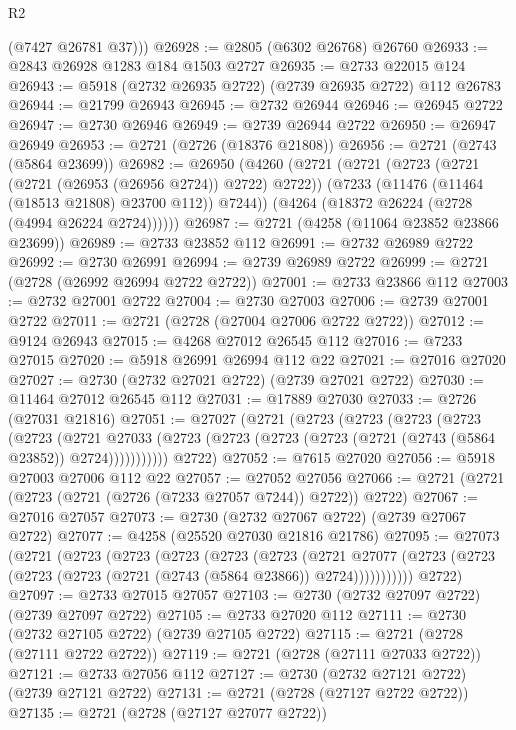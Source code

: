 \begin{lexlean}{R2}
\begin{coremodule}
        (@7427 @26781 @37)))
@26928 := @2805 (@6302 @26768) @26760
@26933 := @2843 @26928 @1283 @184 @1503 @2727
@26935 := @2733 @22015 @124
@26943 := @5918 (@2732 @26935 @2722) (@2739 @26935 @2722) @112 @26783
@26944 := @21799 @26943
@26945 := @2732 @26944
@26946 := @26945 @2722
@26947 := @2730 @26946
@26949 := @2739 @26944 @2722
@26950 := @26947 @26949
@26953 := @2721 (@2726 (@18376 @21808))
@26956 := @2721 (@2743 (@5864 @23699))
@26982 := @26950
    (@4260
      (@2721
        (@2721
          (@2723 (@2721 (@2721 (@26953 (@26956 @2724)) @2722) @2722))
          (@7233 (@11476 (@11464 (@18513 @21808) @23700 @112)) @7244))
        (@4264 (@18372 @26224 (@2728 (@4994 @26224 @2724))))))
@26987 := @2721 (@4258 (@11064 @23852 @23866 @23699))
@26989 := @2733 @23852 @112
@26991 := @2732 @26989 @2722
@26992 := @2730 @26991
@26994 := @2739 @26989 @2722
@26999 := @2721 (@2728 (@26992 @26994 @2722 @2722))
@27001 := @2733 @23866 @112
@27003 := @2732 @27001 @2722
@27004 := @2730 @27003
@27006 := @2739 @27001 @2722
@27011 := @2721 (@2728 (@27004 @27006 @2722 @2722))
@27012 := @9124 @26943
@27015 := @4268 @27012 @26545 @112
@27016 := @7233 @27015
@27020 := @5918 @26991 @26994 @112 @22
@27021 := @27016 @27020
@27027 := @2730 (@2732 @27021 @2722) (@2739 @27021 @2722)
@27030 := @11464 @27012 @26545 @112
@27031 := @17889 @27030
@27033 := @2726 (@27031 @21816)
@27051 := @27027
    (@2721
      (@2723
        (@2723
          (@2723
            (@2723
              (@2723
                (@2721
                  @27033
                  (@2723 (@2723 (@2723 (@2723 (@2721 (@2743 (@5864 @23852)) @2724)))))))))))
      @2722)
@27052 := @7615 @27020
@27056 := @5918 @27003 @27006 @112 @22
@27057 := @27052 @27056
@27066 := @2721 (@2721 (@2723 (@2721 (@2726 (@7233 @27057 @7244)) @2722)) @2722)
@27067 := @27016 @27057
@27073 := @2730 (@2732 @27067 @2722) (@2739 @27067 @2722)
@27077 := @4258 (@25520 @27030 @21816 @21786)
@27095 := @27073
    (@2721
      (@2723
        (@2723
          (@2723
            (@2723
              (@2723
                (@2721
                  @27077
                  (@2723 (@2723 (@2723 (@2723 (@2721 (@2743 (@5864 @23866)) @2724)))))))))))
      @2722)
@27097 := @2733 @27015 @27057
@27103 := @2730 (@2732 @27097 @2722) (@2739 @27097 @2722)
@27105 := @2733 @27020 @112
@27111 := @2730 (@2732 @27105 @2722) (@2739 @27105 @2722)
@27115 := @2721 (@2728 (@27111 @2722 @2722))
@27119 := @2721 (@2728 (@27111 @27033 @2722))
@27121 := @2733 @27056 @112
@27127 := @2730 (@2732 @27121 @2722) (@2739 @27121 @2722)
@27131 := @2721 (@2728 (@27127 @2722 @2722))
@27135 := @2721 (@2728 (@27127 @27077 @2722))

\end{coremodule}
\end{lexlean}
